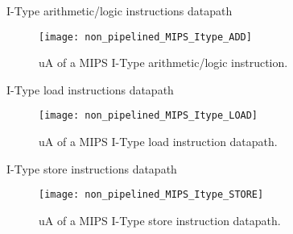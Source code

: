 % 
\begin{frame}{I-Type arithmetic/logic instructions datapath}
  \begin{figure}
  \centering
  \texttt{[image: non\_pipelined\_MIPS\_Itype\_ADD]}
  \vspace{-3pt}
  \caption{\ac{uA} of a \ac{MIPS} I-Type arithmetic/logic instruction.}
  \label{Figure:non_pipelined_MIPS_Itype_ADD}
  \end{figure}
\end{frame}


% 


% 
\begin{frame}{I-Type load instructions datapath}
  \begin{figure}
  \centering
  \texttt{[image: non\_pipelined\_MIPS\_Itype\_LOAD]}
  \vspace{-3pt}
  \caption{\ac{uA} of a \ac{MIPS} I-Type load instruction datapath.}
  \label{Figure:non_pipelined_MIPS_Itype_LOAD}
  \end{figure}
\end{frame}

% 
\begin{frame}{I-Type store instructions datapath}
  \begin{figure}
  \centering
  \texttt{[image: non\_pipelined\_MIPS\_Itype\_STORE]}
  \vspace{-3pt}
  \caption{\ac{uA} of a \ac{MIPS} I-Type store instruction datapath.}
  \label{Figure:non_pipelined_MIPS_Itype_STORE}
  \end{figure}
\end{frame}

